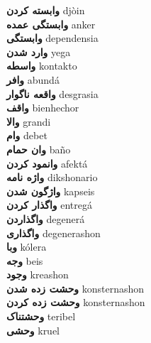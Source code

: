 \textbf{ وابسته کردن  } djòin \\
\textbf{ وابستگی عمده  } anker \\
\textbf{ وابستگی  } dependensia \\
\textbf{ وارد شدن  } yega \\
\textbf{ واسطه  } kontakto \\
\textbf{ وافر  } abundá \\
\textbf{ واقعه ناگوار  } desgrasia \\
\textbf{ واقف  } bienhechor \\
\textbf{ والا  } grandi \\
\textbf{ وام  } debet \\
\textbf{ وان حمام  } baño \\
\textbf{ وانمود کردن  } afektá \\
\textbf{ واژه نامه  } dikshonario \\
\textbf{ واژگون شدن  } kapseis \\
\textbf{ واگذار کردن  } entregá \\
\textbf{ واگذاردن  } degenerá \\
\textbf{ واگذاری  } degenerashon \\
\textbf{ وبا  } kólera \\
\textbf{ وجه  } beis \\
\textbf{ وجود  } kreashon \\
\textbf{ وحشت زده شدن  } konsternashon \\
\textbf{ وحشت زده کردن  } konsternashon \\
\textbf{ وحشتناک  } teribel \\
\textbf{ وحشی  } kruel \\
